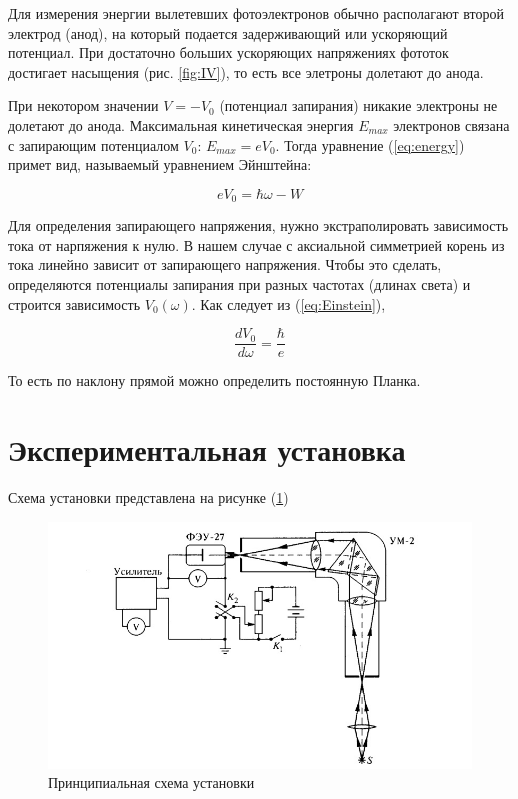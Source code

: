 \documentclass[a4paper, 12pt]{article}
\begin{document}
Для измерения энергии вылетевших фотоэлектронов обычно располагают второй электрод
(анод), на который подается задерживающий или ускоряющий потенциал. При достаточно больших
ускоряющих напряжениях фототок достигает насыщения (рис. \ref{fig:IV}), то есть все элетроны долетают до анода.

При некотором значении $ V = -V_0 $ (потенциал запирания) никакие электроны не долетают до анода.
Максимальная кинетическая энергия $ E_{max} $ электронов связана с запирающим потенциалом $ V_0 $: $ E_{max} = eV_0 $. Тогда уравнение (\ref{eq:energy}) примет вид, называемый уравнением Эйнштейна:
	
\begin{equation}
	eV_0 = \hbar\omega - W
	\label{eq:Einstein}
\end{equation}

Для определения запирающего напряжения, нужно экстраполировать зависимость тока от нарпяжения к нулю. В нашем случае с аксиальной симметрией корень из тока линейно зависит от запирающего напряжения.
Чтобы это сделать, определяются потенциалы запирания при разных частотах (длинах света) и строится зависимость $V_0(\omega)$. Как следует из (\ref{eq:Einstein}),

\begin{equation}
	\dfrac{dV_0}{d\omega} = \dfrac{\hbar}{e}
	\label{eq:dV/dw}
\end{equation}

То есть по наклону прямой можно определить постоянную Планка.


\section{Экспериментальная установка}
Схема установки представлена на рисунке (\ref{fig:set})

\begin{figure}[H]
    \centering
    \includegraphics[width=1\textwidth]{set.jpg}
    \caption{Принципиальная схема установки}
    \label{fig:set}
\end{figure}
\end{document}
